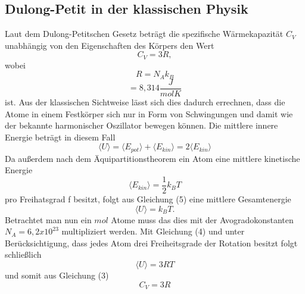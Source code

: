 \documentclass[12pt,a4paper]{article}
\begin{document}
\subsection{Dulong-Petit in der klassischen Physik}
Laut dem Dulong-Petitschen Gesetz beträgt die spezifische Wärmekapazität $C_V$ unabhängig von den Eigenschaften des Körpers den Wert \[C_V=3R,\]
wobei \begin{equation}
R = N_A k_B
\end{equation}
\begin{equation*}= 8,314 \frac{J}{mol K}
\end{equation*} ist.
Aus der klassischen Sichtweise lässt sich dies dadurch errechnen, dass die Atome in einem Festkörper sich nur in Form 
von Schwingungen und damit wie der bekannte harmonischer Oszillator bewegen können.
Die mittlere innere Energie beträgt in diesem Fall
\begin{equation}
\langle U \rangle = \langle E_{pot} \rangle + \langle E_{kin}\rangle= 2 \langle E_{kin} \rangle
\end{equation}
Da außerdem nach dem Äquipartitionstheorem ein Atom eine mittlere kinetische Energie \begin{equation*}
\langle E_{kin}\rangle = \frac{1}{2}k_BT
\end{equation*} pro Freihatsgrad f besitzt, folgt aus Gleichung (5) eine mittlere Gesamtenergie
\begin{equation}
\langle U \rangle= k_BT.
\end{equation}
Betrachtet man nun ein $mol$ Atome muss das dies mit der Avogradokonstanten $N_A = 6,2 x10^{23}$ multipliziert werden.
Mit Gleichung (4) und unter Berücksichtigung, dass jedes Atom drei Freiheitsgrade der Rotation besitzt folgt schließlich
\begin{equation}
\langle U \rangle = 3RT
\end{equation}
und somit aus Gleichung (3)
\begin{equation}
C_V = 3R
\end{equation}
\end{document}
